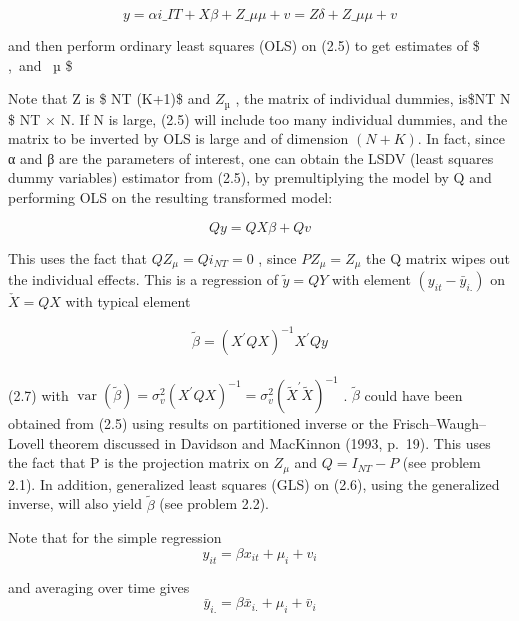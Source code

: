 \documentclass[
]{book}
\begin{document}
\begin{equation} 
y=\alpha i\_{IT} + X\beta + Z\_\mu \mu +v = Z\delta + Z\_\mu \mu +v 
\end{equation}

and then perform ordinary least squares (OLS) on (2.5) to get estimates of \$ \alpha,\beta ~and ~µ \$

Note that Z is \$ NT \times (K+1)\$ and \(Z_µ\) , the matrix of individual dummies, is\$NT \times N \$ NT × N. If N is large, (2.5) will include too many individual dummies, and the matrix to be inverted by OLS is large and of dimension \((N + K)\). In fact, since α and β are the parameters of interest, one can obtain the LSDV (least squares dummy variables) estimator from (2.5), by premultiplying the model by Q and performing OLS on the resulting transformed model:

\begin{equation} Qy=QX\beta + Qv\end{equation}

This uses the fact that \(QZ_\mu =Qi_{NT}=0\) , since \(PZ_\mu =Z_\mu\) the Q matrix wipes out the individual effects. This is a regression of \(\tilde y =QY\) with element \((y_{it} - \bar y _{i.} )\) on \(\check X=QX\) with typical element

\begin{equation}
\widetilde{\beta}=\left(X^{\prime} Q X\right)^{-1} X^{\prime} Q y
\end{equation}\\
(2.7) with \(\operatorname{var}(\widetilde{\beta})=\sigma_{v}^{2}\left(X^{\prime} Q X\right)^{-1}=\sigma_{v}^{2}\left(\widetilde{X}^{\prime} \tilde{X}\right)^{-1}\) . \(\widetilde{\beta}\) could have been obtained from (2.5) using results on partitioned inverse or the Frisch--Waugh--Lovell theorem discussed in Davidson and MacKinnon (1993, p.~19). This uses the fact that P is the projection matrix on \(Z_{\mu}\) and \(Q = I_{NT} − P\) (see problem 2.1). In addition, generalized least squares (GLS) on (2.6), using the generalized inverse, will also yield \(\widetilde{\beta }\) (see problem 2.2).

Note that for the simple regression
\begin{equation}y_{it}=\beta x_{it}+ \mu_i+ v_i     \end{equation}

and averaging over time gives
\begin{equation}  \bar {y}_{i.}= \beta \bar{x}_{i.}+ \mu_i+ \bar{v}_i   \end{equation}
\end{document}
